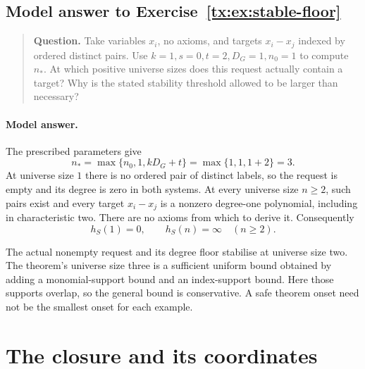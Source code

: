 \documentclass[11pt,a4paper,oneside,openany]{book}
\theoremstyle{definition}\newtheorem{definition}[theorem]{Definition}
\theoremstyle{remark}\newtheorem{remark}[theorem]{Remark}
\numberwithin{equation}{chapter}
\begin{document}
\begin{samepage}

\subsection*{Model answer to Exercise~\ref{tx:ex:stable-floor}}\label{tx:ans:stable-floor}

\begin{quote}\small\textbf{Question.} Take variables $x_i$, no axioms, and targets $x_i-x_j$ indexed by
ordered distinct pairs. Use $k=1,s=0,t=2,D_G=1,n_0=1$ to compute $n_*$.
At which positive universe sizes does this request actually contain a target?
Why is the stated stability threshold allowed to be larger than necessary?
\end{quote}

\paragraph{Model answer.}
The prescribed parameters give
\[
          n_*=\max\{n_0,1,kD_G+t\}
              =\max\{1,1,1+2\}=3.
\]
At universe size \(1\) there is no ordered pair of distinct labels, so the
request is empty and its degree is zero in both systems.
At every universe size \(n\ge2\), such pairs exist and every target
\(x_i-x_j\) is a nonzero degree-one polynomial, including in
characteristic two. There are no axioms from which to derive it.
Consequently
\[
       h_S(1)=0,\qquad h_S(n)=\infty\quad(n\ge2).
\]
\end{samepage}

The actual nonempty request and its degree floor stabilise at universe size
two. The theorem's universe size three is a sufficient uniform bound obtained
by adding a monomial-support bound and an index-support bound.
Here those supports overlap, so the general bound is conservative.
A safe theorem onset need not be the smallest onset for each example.


\par


\section{The closure and its coordinates}
\end{document}
